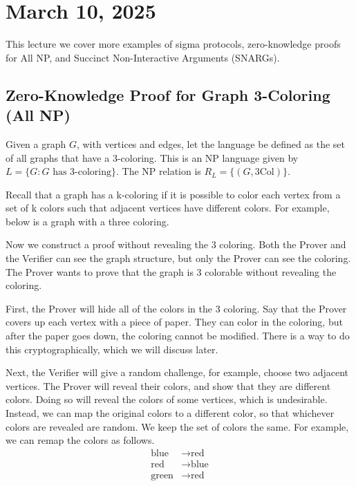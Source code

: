 \section{March 10, 2025}
\label{20250310}

This lecture we cover more examples of sigma protocols, zero-knowledge proofs for All NP, and Succinct Non-Interactive Arguments (SNARGs).


\subsection{Zero-Knowledge Proof for Graph 3-Coloring (All NP)}

Given a graph $G$, with vertices and edges, let the language be defined as the set of all graphs that have a 3-coloring. This is an NP language given by $L = \{ G: G \text{ has 3-coloring}\}$. The NP relation is $R_L = \{ (G, \text{3Col})\}$. 

Recall that a graph has a k-coloring if it is possible to color each vertex from a set of k colors such that adjacent vertices have different colors. For example, below is a graph with a three coloring.

\begin{center}
\end{center}

Now we construct a proof without revealing the 3 coloring. Both the Prover and the Verifier can see the graph structure, but only the Prover can see the coloring. The Prover wants to prove that the graph is 3 colorable without revealing the coloring.

First, the Prover will hide all of the colors in the 3 coloring. Say that the Prover covers up each vertex with a piece of paper. They can color in the coloring, but after the paper goes down, the coloring cannot be modified. There is a way to do this cryptographically, which we will discuss later.

Next, the Verifier will give a random challenge, for example, choose two adjacent vertices. The Prover will reveal their colors, and show that they are different colors. Doing so will reveal the colors of some vertices, which is undesirable. Instead, we can map the original colors to a different color, so that whichever colors are revealed are random. We keep the set of colors the same. For example, we can remap the colors as follows.
\begin{align*}
    \text{blue} &\to \text{red}\\
    \text{red} &\to \text{blue}\\
    \text{green} &\to \text{red}
\end{align*}

